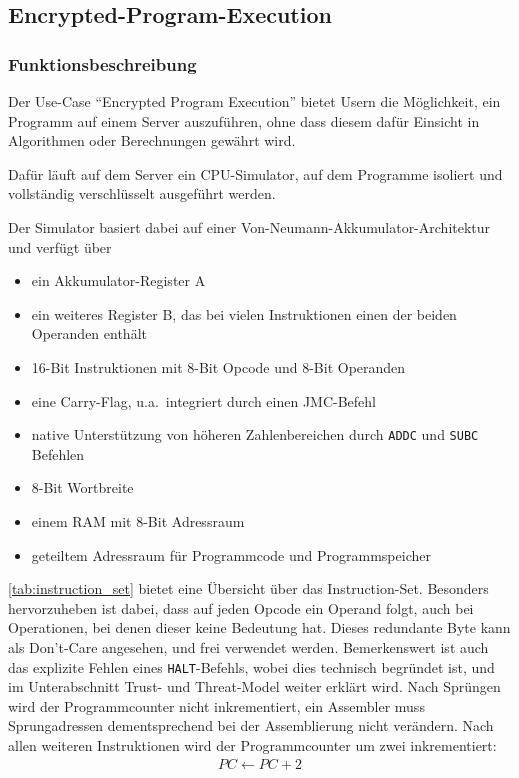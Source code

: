 \subsection{Encrypted-Program-Execution}
\label{sub:encrypted_program_execution}

\subsubsection{Funktionsbeschreibung}
Der Use-Case ``Encrypted Program Execution'' bietet Usern die Möglichkeit,
ein Programm auf einem Server auszuführen, ohne dass diesem dafür Einsicht in Algorithmen oder Berechnungen gewährt wird.

Dafür läuft auf dem Server ein CPU-Simulator, auf dem Programme isoliert und vollständig verschlüsselt ausgeführt werden.

Der Simulator basiert dabei auf einer Von-Neumann-Akkumulator-Architektur und verfügt über

\begin{itemize}
    \item ein Akkumulator-Register A
    \item ein weiteres Register B, das bei vielen Instruktionen einen der beiden Operanden enthält
    \item 16-Bit Instruktionen mit 8-Bit Opcode und 8-Bit Operanden
    \item eine Carry-Flag, u.a.\ integriert durch einen JMC-Befehl
    \item native Unterstützung von höheren Zahlenbereichen durch \texttt{ADDC} und \texttt{SUBC} Befehlen
    \item 8-Bit Wortbreite
    \item einem RAM mit 8-Bit Adressraum
    \item geteiltem Adressraum für Programmcode und Programmspeicher
\end{itemize}

\autoref{tab:instruction_set} bietet eine Übersicht über das Instruction-Set.
Besonders hervorzuheben ist dabei, dass auf jeden Opcode ein Operand folgt, auch bei Operationen,
bei denen dieser keine Bedeutung hat.
Dieses redundante Byte kann als Don't-Care angesehen, und frei verwendet werden.
Bemerkenswert ist auch das explizite Fehlen eines \texttt{HALT}-Befehls, wobei dies technisch begründet ist, und im Unterabschnitt Trust- und Threat-Model weiter erklärt wird.
Nach Sprüngen wird der Programmcounter nicht inkrementiert, ein Assembler muss Sprungadressen dementsprechend bei der Assemblierung nicht verändern.
Nach allen weiteren Instruktionen wird der Programmcounter um zwei inkrementiert:
\begin{gather*}
    PC \leftarrow PC + 2
\end{gather*}

